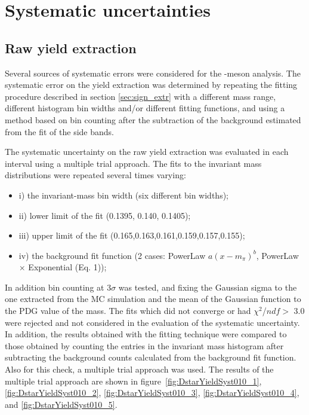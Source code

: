 \linenumbers

\clearpage
\section{Systematic uncertainties}

\subsection{Raw yield extraction}
\label{sec:raw_yield_syst}
Several sources of systematic errors were considered for the \Dstar -meson analysis. The systematic error on the yield extraction was determined by repeating the fitting procedure described in section \ref{sec:sign_extr} with a different mass range, different histogram bin widths and/or different fitting functions, and using a method based on bin counting after the subtraction of the background estimated from the fit of the side bands.%

The systematic uncertainty on the raw yield extraction was evaluated in each \pt interval using a multiple trial approach. The fits to the invariant mass distributions were repeated several times varying:
\begin{itemize}
	\item i) the invariant-mass bin width (six different bin widths);
	\item ii) lower limit of the fit (0.1395, 0.140, 0.1405);
	\item iii) upper  limit  of  the  fit (0.165,0.163,0.161,0.159,0.157,0.155);
	\item iv) the background fit function (2 cases: PowerLaw $a(x - m_\pi)^b$, PowerLaw $\times$ Exponential (Eq. 1));
\end{itemize}  

In addition bin counting at 3$\sigma$ was tested, and fixing the Gaussian sigma to the one extracted from the MC simulation and the mean of the Gaussian function to the PDG value of the \Dstar mass. The fits which did not converge or had $\chi^2$/$ndf> $ 3.0 were rejected and not considered in the evaluation of the systematic uncertainty.  In addition, the results obtained with the fitting technique were compared to those obtained by counting the entries in the invariant mass histogram after subtracting the background counts calculated from the background fit function. Also for this check, a multiple trial approach was used. 
The results of the multiple trial approach are shown in figure~\ref{fig:DstarYieldSyst010_1}, \ref{fig:DstarYieldSyst010_2}, \ref{fig:DstarYieldSyst010_3}, \ref{fig:DstarYieldSyst010_4}, and \ref{fig:DstarYieldSyst010_5}. 

